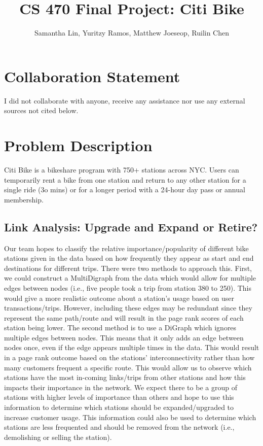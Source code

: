 \documentclass{article}
\title{CS 470 Final Project: Citi Bike}
\author{Samantha Lin, Yuritzy Ramos, Matthew Joeseop, Ruilin Chen}
\begin{document}
\maketitle

\section{Collaboration Statement}
I did not collaborate with anyone, receive any assistance nor use any external sources not cited below.

\section{Problem Description}
Citi Bike is a bikeshare program with 750+ stations across NYC. Users can temporarily rent a bike from one station and return to any other station for a single ride (3o mins) or for a longer period with a 24-hour day pass or annual membership.

\subsection{Link Analysis: Upgrade and Expand or Retire?}
Our team hopes to classify the relative importance/popularity of different bike stations given in the data based on how frequently they appear as start and end destinations for different trips. There were two methods to approach this. First, we could construct a MultiDigraph from the data which would allow for multiple edges between nodes (i.e., five people took a trip from station 380 to 250). This would give a more realistic outcome about a station's usage based on user transactions/trips. However, including these edges may be redundant since they represent the same path/route and will result in the page rank scores of each station being lower. The second method is to use a DiGraph which ignores multiple edges between nodes. This means that it only adds an edge between nodes once, even if the edge appears multiple times in the data. This would result in a page rank outcome based on the stations’ interconnectivity rather than how many customers frequent a specific route. This would allow us to observe which stations have the most in-coming links/trips from other stations and how this impacts their importance in the network. We expect there to be a group of stations with higher levels of importance than others and hope to use this information to determine which stations should be expanded/upgraded to increase customer usage. This information could also be used to determine which stations are less frequented and should be removed from the network (i.e., demolishing or selling the station). 
\end{document}
